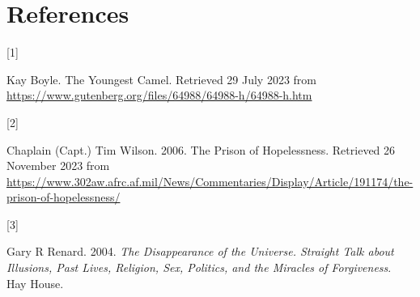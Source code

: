 \documentclass[
  a4paper,
]{article}
\newlength{\cslhangindent}
\newlength{\csllabelwidth}
\newlength{\cslentryspacingunit} %
\newenvironment{CSLReferences}[2] %
 {%
  \setlength{\parindent}{0pt}
  \ifodd #1
  \let\oldpar\par
  \def\par{\hangindent=\cslhangindent\oldpar}
  \fi
  \setlength{\parskip}{#2\cslentryspacingunit}
 }%
 {}
\newcommand{\CSLLeftMargin}[1]{\parbox[t]{\csllabelwidth}{#1}}
\newcommand{\CSLRightInline}[1]{\parbox[t]{\linewidth - \csllabelwidth}{#1}\break}
\begin{document}
\hypertarget{bibliography}{%
\section*{References}\label{bibliography}}

\hypertarget{refs}{}
\begin{CSLReferences}{0}{0}
\leavevmode{}%
\CSLLeftMargin{{[}1{]} }%
\CSLRightInline{Kay Boyle. {The Youngest Camel}. Retrieved 29 July 2023
from \url{https://www.gutenberg.org/files/64988/64988-h/64988-h.htm}}

\leavevmode{}%
\CSLLeftMargin{{[}2{]} }%
\CSLRightInline{Chaplain (Capt.) Tim Wilson. 2006. {The Prison of
Hopelessness}. Retrieved 26 November 2023 from
\url{https://www.302aw.afrc.af.mil/News/Commentaries/Display/Article/191174/the-prison-of-hopelessness/}}

\leavevmode{}%
\CSLLeftMargin{{[}3{]} }%
\CSLRightInline{Gary R Renard. 2004. \emph{{The Disappearance of the
Universe}. {Straight Talk about Illusions, Past Lives, Religion, Sex,
Politics, and the Miracles of Forgiveness}}. Hay House.}

\end{CSLReferences}
\end{document}
